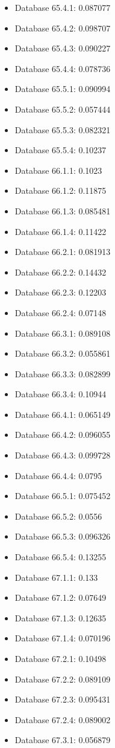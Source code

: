 \begin{itemize}
\item Database 65.4.1: 0.087077
\item Database 65.4.2: 0.098707
\item Database 65.4.3: 0.090227
\item Database 65.4.4: 0.078736
\item Database 65.5.1: 0.090994
\item Database 65.5.2: 0.057444
\item Database 65.5.3: 0.082321
\item Database 65.5.4: 0.10237
\item Database 66.1.1: 0.1023
\item Database 66.1.2: 0.11875
\item Database 66.1.3: 0.085481
\item Database 66.1.4: 0.11422
\item Database 66.2.1: 0.081913
\item Database 66.2.2: 0.14432
\item Database 66.2.3: 0.12203
\item Database 66.2.4: 0.07148
\item Database 66.3.1: 0.089108
\item Database 66.3.2: 0.055861
\item Database 66.3.3: 0.082899
\item Database 66.3.4: 0.10944
\item Database 66.4.1: 0.065149
\item Database 66.4.2: 0.096055
\item Database 66.4.3: 0.099728
\item Database 66.4.4: 0.0795
\item Database 66.5.1: 0.075452
\item Database 66.5.2: 0.0556
\item Database 66.5.3: 0.096326
\item Database 66.5.4: 0.13255
\item Database 67.1.1: 0.133
\item Database 67.1.2: 0.07649
\item Database 67.1.3: 0.12635
\item Database 67.1.4: 0.070196
\item Database 67.2.1: 0.10498
\item Database 67.2.2: 0.089109
\item Database 67.2.3: 0.095431
\item Database 67.2.4: 0.089002
\item Database 67.3.1: 0.056879

\end{itemize}
